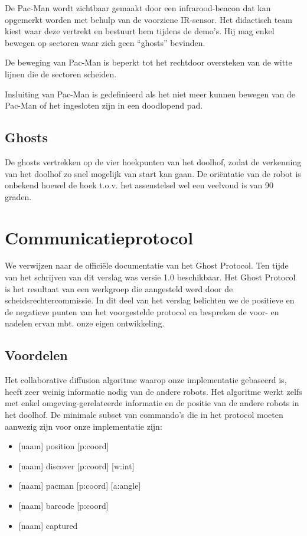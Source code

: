 \documentclass[12pt,a4paper]{report}
\begin{document}
De Pac-Man wordt zichtbaar gemaakt door een infrarood-beacon dat kan opgemerkt worden met behulp van de voorziene IR-sensor. Het didactisch team kiest waar deze vertrekt en bestuurt hem tijdens de demo's. Hij mag enkel bewegen op sectoren waar zich geen ``ghosts'' bevinden.

De beweging van Pac-Man is beperkt tot het rechtdoor oversteken van de witte lijnen die de sectoren scheiden.

Insluiting van Pac-Man is gedefinieerd als het niet meer kunnen bewegen van de Pac-Man of het ingesloten zijn in een doodlopend pad.

\subsection{Ghosts}

De ghosts vertrekken op de vier hoekpunten van het doolhof, zodat de verkenning van het doolhof zo snel mogelijk van start kan gaan. De ori\"entatie van de robot is onbekend hoewel de hoek t.o.v. het assenstelsel wel een veelvoud is van 90 graden.


\section{Communicatieprotocol}

We verwijzen naar de offici\"ele documentatie van het Ghost Protocol. Ten tijde van het schrijven van dit verslag was versie 1.0 beschikbaar. Het Ghost Protocol is het resultaat van een werkgroep die aangesteld werd door de scheidsrechtercommissie. In dit deel van het verslag belichten we de positieve en de negatieve punten van het voorgestelde protocol en bespreken de voor- en nadelen ervan mbt. onze eigen ontwikkeling.

\subsection{Voordelen}

Het collaborative diffusion algoritme waarop onze implementatie gebaseerd is, heeft zeer weinig informatie nodig van de andere robots. Het algoritme werkt zelfs met enkel omgeving-gerelateerde informatie en de positie van de andere robots in het doolhof. De minimale subset van commando's die in het protocol moeten aanwezig zijn voor onze implementatie zijn:

\begin{itemize}
	\item{ [naam] position [p:coord]}
	\item{ [naam] discover [p:coord] [w:int]}
	\item{ [naam] pacman [p:coord] [a:angle]}
	\item{ [naam] barcode [p:coord] }
	\item{ [naam] captured }
\end{itemize}
\end{document}
